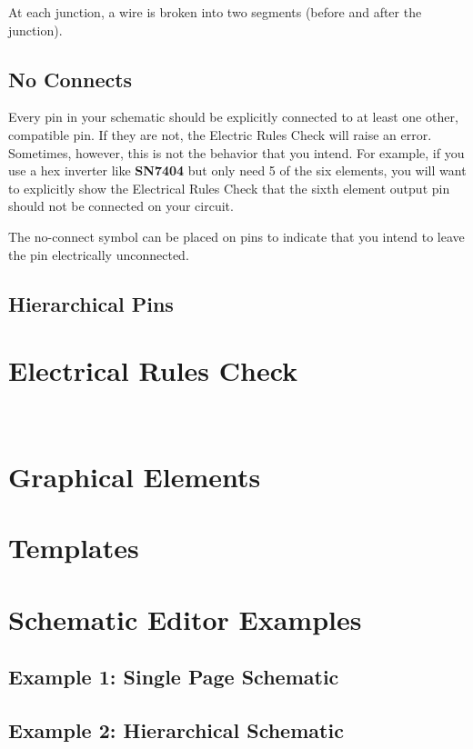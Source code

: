 At each junction, a wire is broken into two segments (before and after the junction).

\subsection{No Connects}
Every pin in your schematic should be explicitly connected to at least one other, compatible pin.
If they are not, the Electric Rules Check will raise an error.
Sometimes, however, this is not the behavior that you intend.
For example, if you use a hex inverter like \textbf{SN7404} but only need 5 of the six elements, you will want to explicitly show the Electrical Rules Check that the sixth element output pin should not be connected on your circuit.

The no-connect symbol can be placed on pins to indicate that you intend to leave the pin electrically unconnected.

\subsection{Hierarchical Pins}


\section{Electrical Rules Check}
\

\section{Graphical Elements}

\section{Templates}

\section{Schematic Editor Examples}
\subsection{Example 1: Single Page Schematic}
\subsection{Example 2: Hierarchical Schematic}